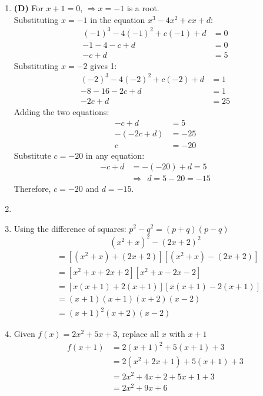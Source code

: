 \begin{multicols}{2}
\begin{enumerate}[label={\textbf{\arabic*.}}]
\item \textbf{(D)} For \( x + 1 = 0 \), \(\Rightarrow x = -1\) is a root. \\
Substituting \( x = -1 \) in the equation \( x^3 - 4x^2 + cx + d \):
\begin{align*}
(-1)^3 - 4(-1)^2 + c(-1) + d &= 0 \\
-1 - 4 - c + d &= 0 \\
-c + d &= 5
\end{align*}
Substituting \( x = -2 \) gives 1:
\begin{align*}
(-2)^3 - 4(-2)^2 + c(-2) + d &= 1 \\
-8 - 16 - 2c + d &= 1 \\
-2c + d &= 25
\end{align*}
Adding the two equations:
\begin{align*}
-c + d &= 5 \\
-(-2c + d) &= -25 \\
c &= -20
\end{align*}
Substitute \( c = -20 \) in any equation:
\begin{align*}
-c + d &= -(-20) + d = 5 \\
& \Rightarrow \hspace{5pt} d = 5 - 20 = -15
\end{align*}
Therefore, \( c = -20 \) and \( d = -15 \).
\item

\item Using the difference of squares: \(p^2 - q^2 = (p + q)(p - q)\)
\[(x^2 + x)^2 - (2x + 2)^2\]
\begin{align*}
&= \left[(x^2 + x) + (2x + 2)\right]\left[(x^2 + x) - (2x + 2)\right] \\
&= \left[x^2 + x + 2x + 2\right]\left[x^2 + x - 2x - 2\right] \\
&= \left[x(x + 1) + 2(x + 1)\right]\left[x(x + 1) - 2(x + 1)\right] \\
&= (x + 1)(x + 1)(x + 2)(x - 2) \\
&= (x + 1)^2(x + 2)(x - 2)
\end{align*}

\item Given \(f(x) = 2x^2 + 5x + 3\), replace all \(x\) with \(x + 1\)
\begin{align*}
f(x + 1) &= 2(x + 1)^2+ 5(x +1) + 3 \\
& = 2(x^2 + 2x + 1) + 5(x + 1) + 3 \\
& = 2x^2 + 4x + 2 + 5x + 1 + 3 \\
& = 2x^2 + 9x + 6
\end{align*}


\end{enumerate}
\end{multicols}
